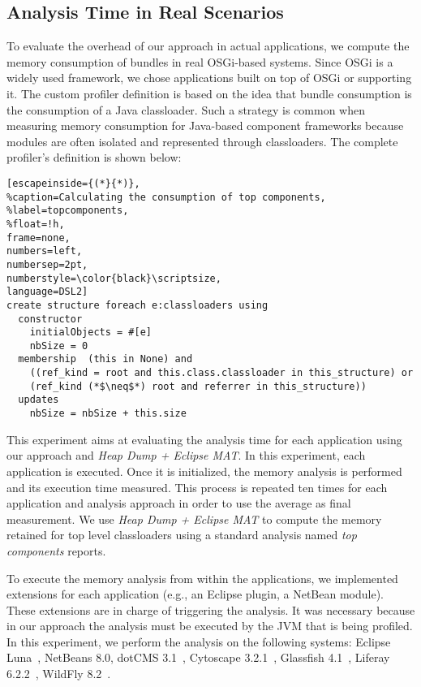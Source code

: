 \subsection{Analysis Time in Real Scenarios}
To evaluate the overhead of our approach in actual applications, 
we compute the memory consumption of bundles in real OSGi-based systems.
Since OSGi is a widely used framework, we chose applications built on top of OSGi or supporting it.
The custom profiler definition is based on the idea that bundle consumption is the consumption of a Java classloader.
Such a strategy is common when measuring memory consumption for Java-based component frameworks because modules are often isolated and represented through classloaders.
The complete profiler's definition is shown below:
\begin{lstlisting}[escapeinside={(*}{*)},
%caption=Calculating the consumption of top components,
%label=topcomponents,
%float=!h, 
frame=none,
numbers=left,
numbersep=2pt,
numberstyle=\color{black}\scriptsize,
language=DSL2]
create structure foreach e:classloaders using
  constructor
    initialObjects = #[e]
    nbSize = 0
  membership  (this in None) and 
    ((ref_kind = root and this.class.classloader in this_structure) or
	(ref_kind (*$\neq$*) root and referrer in this_structure))
  updates
    nbSize = nbSize + this.size
\end{lstlisting}

This experiment aims at evaluating the analysis time for each application using our approach and \textit{Heap Dump + Eclipse MAT}.
In this experiment, each application is executed. Once it is initialized, the memory analysis is performed and its execution time measured.
This process is repeated ten times for each application and analysis approach in order to use the average as final measurement.
We use \textit{Heap Dump + Eclipse MAT}  to compute the memory retained for top level classloaders using  a standard analysis named \textit{top components} reports. 

To execute the memory analysis from within the applications, we implemented extensions for each application (e.g., an Eclipse plugin, a NetBean module).
These extensions are in charge of triggering the analysis.
It was necessary because in our approach the analysis must be executed by the JVM that is being profiled.
In this experiment, we perform the analysis on the following systems: Eclipse Luna~\cite{luna}, NetBeans 8.0\cite{netbeans}, dotCMS 3.1~\cite{dotcms}, Cytoscape 3.2.1~\cite{cytoscape}, Glassfish 4.1~\cite{glassfish},  Liferay 6.2.2~\cite{liferay}, WildFly 8.2~\cite{wildfly}.

